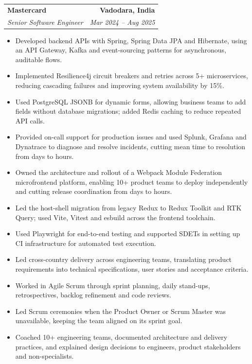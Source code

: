 \documentclass[a4paper,10pt]{article}
\makeatletter
\newcommand{\resumeItem}[1]{\item\small #1}
\newcommand{\resumeSubheading}[4]{
  \item[]
  \begin{tabular*}{\textwidth}{l@{\extracolsep{\fill}}r}
    \textbf{#1} & \textbf{\small #2} \\
    \textit{\small #3} & \textit{\small #4}
  \end{tabular*}\vspace{-3pt}
}
\newcommand{\resumeItemListStart}{\begin{itemize}[leftmargin=14pt,itemsep=1.4pt,topsep=2pt,parsep=0pt]}
\newcommand{\resumeItemListEnd}{\end{itemize}\vspace{1pt}}
\makeatother
\begin{document}
  \resumeSubheading{Mastercard}{Vadodara, India}{Senior Software Engineer}{Mar 2024 -- Aug 2025}
  \resumeItemListStart
    \resumeItem{Developed backend APIs with Spring, Spring Data JPA and Hibernate, using an API Gateway, Kafka and event-sourcing patterns for asynchronous, auditable flows.}
    \resumeItem{Implemented Resilience4j circuit breakers and retries across 5+ microservices, reducing cascading failures and improving system availability by 15\%.}
    \resumeItem{Used PostgreSQL JSONB for dynamic forms, allowing business teams to add fields without database migrations; added Redis caching to reduce repeated API calls.}
    \resumeItem{Provided on-call support for production issues and used Splunk, Grafana and Dynatrace to diagnose and resolve incidents, cutting mean time to resolution from days to hours.}
    \resumeItem{Owned the architecture and rollout of a Webpack Module Federation microfrontend platform, enabling 10+ product teams to deploy independently and cutting release coordination from days to hours.}
    \resumeItem{Led the host-shell migration from legacy Redux to Redux Toolkit and RTK Query; used Vite, Vitest and esbuild across the frontend toolchain.}
    \resumeItem{Used Playwright for end-to-end testing and supported SDETs in setting up CI infrastructure for automated test execution.}
    \resumeItem{Led cross-country delivery across engineering teams, translating product requirements into technical specifications, user stories and acceptance criteria.}
    \resumeItem{Worked in Agile Scrum through sprint planning, daily stand-ups, retrospectives, backlog refinement and code reviews.}
    \resumeItem{Led Scrum ceremonies when the Product Owner or Scrum Master was unavailable, keeping the team aligned on its sprint goal.}
    \resumeItem{Coached 10+ engineering teams, documented architecture and delivery practices, and explained design decisions to engineers, product stakeholders and non-specialists.}
  \resumeItemListEnd
\end{document}
